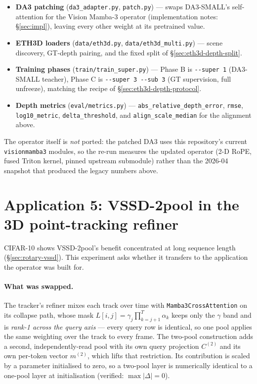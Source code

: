 \documentclass[11pt,a4paper]{article}
\begin{document}
\begin{itemize}
  \item \textbf{DA3 patching} (\texttt{da3\_adapter.py}, \texttt{patch.py}) ---
        swaps DA3-SMALL's self-attention for the Vision Mamba-3 operator
        (implementation notes: \S\ref{sec:impl}), leaving every other weight at its pretrained value.
  \item \textbf{ETH3D loaders} (\texttt{data/eth3d.py},
        \texttt{data/eth3d\_\allowbreak{}multi.py}) --- scene discovery, GT-depth pairing,
        and the fixed split of \S\ref{sec:eth3d-depth-split}.
  \item \textbf{Training phases} (\texttt{train/train\_\allowbreak{}super.py}) --- Phase B is
        \texttt{-{}-super 1} (DA3-SMALL teacher), Phase C is
        \texttt{-{}-super 3 -{}-sub 3} (GT supervision, full unfreeze), matching
        the recipe of \S\ref{sec:eth3d-depth-protocol}.
  \item \textbf{Depth metrics} (\texttt{eval/metrics.py}) ---
        \texttt{abs\_\allowbreak{}relative\_\allowbreak{}depth\_\allowbreak{}error}, \texttt{rmse},
        \texttt{log10\_metric}, \texttt{delta\_threshold}, and
        \texttt{align\_\allowbreak{}scale\_\allowbreak{}median} for the alignment above.
\end{itemize}

The operator itself is \emph{not} ported: the patched DA3 uses this
repository's current \texttt{visionmamba3} modules, so the re-run measures the
updated operator (2-D RoPE, fused Triton kernel, pinned upstream submodule)
rather than the 2026-04 snapshot that produced the legacy numbers above.

\section{Application 5: VSSD-2pool in the 3D point-tracking refiner}
\label{sec:vssd-bg-tracking}

CIFAR-10 shows VSSD-2pool's benefit concentrated at long sequence length
(\S\ref{sec:rotary-vssd}). This experiment asks whether it transfers to the application the
operator was built for.

\paragraph{What was swapped.} The tracker's refiner mixes each track over time with
\texttt{Mamba3CrossAttention} on its collapse path, whose mask
$L[i,j] = \gamma_j \prod_{k=j+1}^{T}\alpha_k$ keeps only the $\gamma$ band and is \emph{rank-1
across the query axis} --- every query row is identical, so one pool applies the same weighting
over the track to every frame. The two-pool construction adds a second, independently-read pool
with its own query projection $C^{(2)}$ and its own per-token vector $m^{(2)}$, which lifts that
restriction. Its contribution is scaled by a parameter initialised to zero, so a two-pool layer is
numerically identical to a one-pool layer at initialisation (verified: $\max|\Delta| = 0$).
\end{document}
